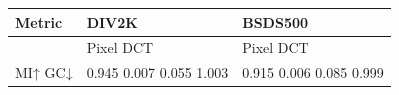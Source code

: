 \begin{tabular}{lll}
\toprule
Metric & DIV2K & BSDS500 \\
\midrule
 & Pixel DCT & Pixel DCT \\
MI↑ GC↓ & 0.945 0.007 0.055 1.003 & 0.915 0.006 0.085 0.999 \\
\bottomrule
\end{tabular}
